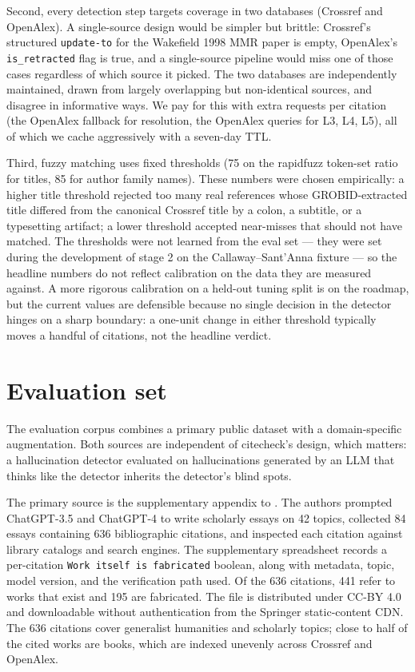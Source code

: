 \documentclass[12pt]{article}
\begin{document}
Second, every detection step targets coverage in two databases (Crossref and OpenAlex). A single-source design would be simpler but brittle: Crossref's structured \texttt{update-to} for the Wakefield 1998 MMR paper is empty, OpenAlex's \texttt{is\_retracted} flag is true, and a single-source pipeline would miss one of those cases regardless of which source it picked. The two databases are independently maintained, drawn from largely overlapping but non-identical sources, and disagree in informative ways. We pay for this with extra requests per citation (the OpenAlex fallback for resolution, the OpenAlex queries for L3, L4, L5), all of which we cache aggressively with a seven-day TTL.

Third, fuzzy matching uses fixed thresholds (75 on the rapidfuzz token-set ratio for titles, 85 for author family names). These numbers were chosen empirically: a higher title threshold rejected too many real references whose GROBID-extracted title differed from the canonical Crossref title by a colon, a subtitle, or a typesetting artifact; a lower threshold accepted near-misses that should not have matched. The thresholds were not learned from the eval set --- they were set during the development of stage 2 on the Callaway--Sant'Anna fixture --- so the headline numbers do not reflect calibration on the data they are measured against. A more rigorous calibration on a held-out tuning split is on the roadmap, but the current values are defensible because no single decision in the detector hinges on a sharp boundary: a one-unit change in either threshold typically moves a handful of citations, not the headline verdict.

\section{Evaluation set}\label{sec:eval-set}

The evaluation corpus combines a primary public dataset with a domain-specific augmentation. Both sources are independent of citecheck's design, which matters: a hallucination detector evaluated on hallucinations generated by an LLM that thinks like the detector inherits the detector's blind spots.

The primary source is the supplementary appendix to \citet{walters_wilder_2023}. The authors prompted ChatGPT-3.5 and ChatGPT-4 to write scholarly essays on 42 topics, collected 84 essays containing 636 bibliographic citations, and inspected each citation against library catalogs and search engines. The supplementary spreadsheet records a per-citation \texttt{Work itself is fabricated} boolean, along with metadata, topic, model version, and the verification path used. Of the 636 citations, 441 refer to works that exist and 195 are fabricated. The file is distributed under CC-BY 4.0 and downloadable without authentication from the Springer static-content CDN. The 636 citations cover generalist humanities and scholarly topics; close to half of the cited works are books, which are indexed unevenly across Crossref and OpenAlex.
\end{document}
